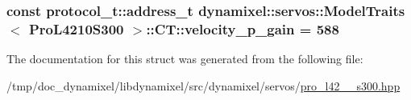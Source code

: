 \subsubsection[{velocity\+\_\+p\+\_\+gain}]{\setlength{\rightskip}{0pt plus 5cm}const {\bf protocol\+\_\+t\+::address\+\_\+t} {\bf dynamixel\+::servos\+::\+Model\+Traits}$<$ {\bf Pro\+L4210\+S300} $>$\+::C\+T\+::velocity\+\_\+p\+\_\+gain = 588\hspace{0.3cm}{\ttfamily [static]}}\label{structdynamixel_1_1servos_1_1_model_traits_3_01_pro_l4210_s300_01_4_1_1_c_t_ae0ead7bf8821dc99c008826dc5977902}


The documentation for this struct was generated from the following file\+:\begin{DoxyCompactItemize}
\item 
/tmp/doc\+\_\+dynamixel/libdynamixel/src/dynamixel/servos/\hyperlink{pro__l42__10__s300_8hpp}{pro\+\_\+l42\+\_\+\_\+s300.\+hpp}\end{DoxyCompactItemize}
